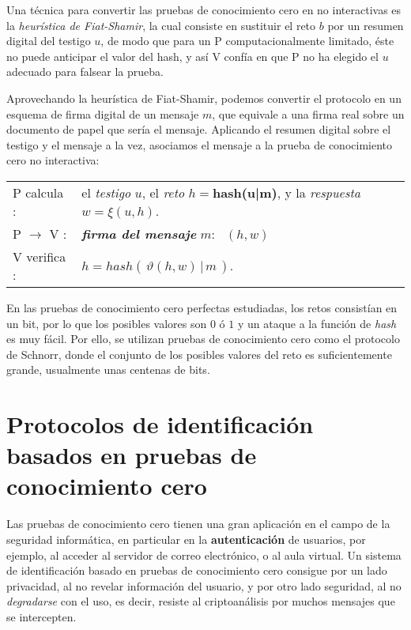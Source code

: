 Una técnica para convertir las pruebas de conocimiento cero en no interactivas es la \textit{heurística de Fiat-Shamir}, la cual consiste en sustituir el reto $b$ por un resumen digital del testigo $u$, de modo que para un P computacionalmente limitado, éste no puede anticipar el valor del hash, y así V confía en que P no ha elegido el $u$ adecuado para falsear la prueba.

\hfil

Aprovechando la heurística de Fiat-Shamir, podemos convertir el protocolo en un esquema de firma digital de un mensaje $m$, que equivale a una firma real sobre un documento de papel que sería el mensaje. Aplicando el resumen digital sobre el testigo y el mensaje a la vez, asociamos el mensaje a la prueba de conocimiento cero no interactiva:


\begin{center}
	\begin{tabular}{ll}\label{fiat-shamir-heur}
		P calcula :& el \textit{testigo} $u$, el \textit{reto} $h=$\textbf{hash(u|m)}, y la \textit{respuesta} $w = \xi(u, h)$.
		\\
		P $\rightarrow$ V :& \textit{\textbf{firma del mensaje}} $m$: \, $(h,w)$
		\\
		V verifica :& $h=hash(\,\vartheta(h,w)\,|\,m\,)$.
	\end{tabular}
\end{center}

\hfil


\begin{remark}
	\hfil
	
	En las pruebas de conocimiento cero perfectas estudiadas, los retos consistían en un bit, por lo que los posibles valores son $0$ ó $1$ y un ataque a la función de \textit{hash} es muy fácil. Por ello, se utilizan pruebas de conocimiento cero como el protocolo de Schnorr, donde el conjunto de los posibles valores del reto es suficientemente grande, usualmente unas centenas de bits.
\end{remark}








\section{Protocolos de identificación basados en pruebas de conocimiento cero}


Las pruebas de conocimiento cero tienen una gran aplicación en el campo de la seguridad informática, en particular en la \textbf{autenticación} de usuarios, por ejemplo, al acceder al servidor de correo electrónico, o al aula virtual. Un sistema de identificación basado en pruebas de conocimiento cero consigue por un lado privacidad, al no revelar información del usuario, y por otro lado seguridad, al no \textit{degradarse} con el uso, es decir, resiste al criptoanálisis por muchos mensajes que se intercepten.

